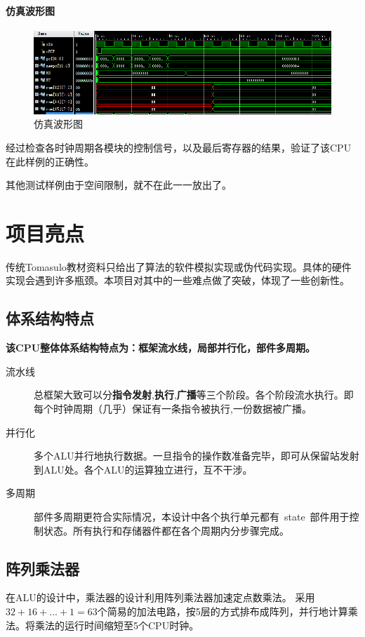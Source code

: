 \documentclass[twoside]{article}
\begin{document}
\paragraph{仿真波形图}

\begin{figure}[htp]
    \centering
    \includegraphics[width=15cm]{"./figure/simulationiDiagram.png"}
    \caption{仿真波形图}
    \label{fig:simulationiDiagram}
\end{figure}


经过检查各时钟周期各模块的控制信号，以及最后寄存器的结果，验证了该CPU在此样例的正确性。

其他测试样例由于空间限制，就不在此一一放出了。


\section{项目亮点}
传统Tomasulo教材资料只给出了算法的软件模拟实现或伪代码实现。具体的硬件实现会遇到许多瓶颈。本项目对其中的一些难点做了突破，体现了一些创新性。
\subsection{体系结构特点}
\textbf{该CPU整体体系结构特点为：框架流水线，局部并行化，部件多周期。} 
\begin{description}
	\item[流水线] 总框架大致可以分\textbf{指令发射},\textbf{执行},\textbf{广播}等三个阶段。各个阶段流水执行。即每个时钟周期（几乎）保证有一条指令被执行,一份数据被广播。
	\item[并行化] 多个ALU并行地执行数据。一旦指令的操作数准备完毕，即可从保留站发射到ALU处。各个ALU的运算独立进行，互不干涉。
	\item[多周期] 部件多周期更符合实际情况，本设计中各个执行单元都有~state~部件用于控制状态。所有执行和存储器件都在各个周期内分步骤完成。
\end{description}

\subsection{阵列乘法器}
在ALU的设计中，乘法器的设计利用阵列乘法器加速定点数乘法。  
采用$32 + 16 +... +1=63$个简易的加法电路，按5层的方式排布成阵列，并行地计算乘法。将乘法的运行时间缩短至5个CPU时钟。
\end{document}
